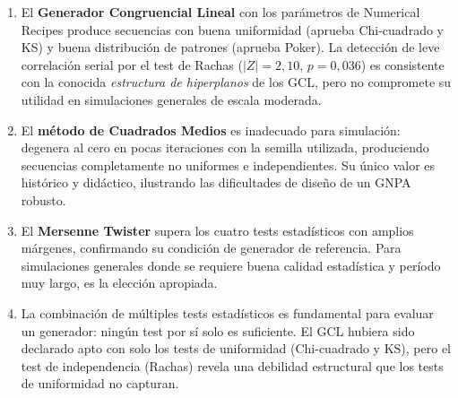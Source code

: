 \documentclass[a4paper, 11pt]{article}
\begin{document}
\begin{enumerate}
  \item El \textbf{Generador Congruencial Lineal} con los parámetros de
        Numerical Recipes produce secuencias con buena uniformidad (aprueba
        Chi-cuadrado y KS) y buena distribución de patrones (aprueba Poker).
        La detección de leve correlación serial por el test de Rachas
        ($|Z| = 2{,}10$, $p = 0{,}036$) es consistente con la conocida
        \textit{estructura de hiperplanos} de los GCL, pero no compromete su
        utilidad en simulaciones generales de escala moderada.

  \item El \textbf{método de Cuadrados Medios} es inadecuado para simulación:
        degenera al cero en pocas iteraciones con la semilla utilizada,
        produciendo secuencias completamente no uniformes e independientes.
        Su único valor es histórico y didáctico, ilustrando las dificultades
        de diseño de un GNPA robusto.

  \item El \textbf{Mersenne Twister} supera los cuatro tests estadísticos con
        amplios márgenes, confirmando su condición de generador de referencia.
        Para simulaciones generales donde se requiere buena calidad estadística
        y período muy largo, es la elección apropiada.

  \item La combinación de múltiples tests estadísticos es fundamental para
        evaluar un generador: ningún test por sí solo es suficiente. El GCL
        hubiera sido declarado apto con solo los tests de uniformidad (Chi-cuadrado
        y KS), pero el test de independencia (Rachas) revela una debilidad
        estructural que los tests de uniformidad no capturan.
\end{enumerate}



\end{document}
